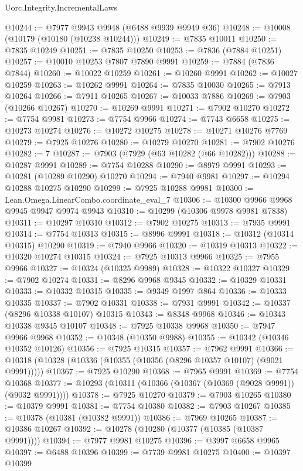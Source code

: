 \begin{lexlean}{Uorc.Integrity.IncrementalLaws}
\begin{coremodule}
@10244 := @7977 @9943 @9948 (@6488 @9939 @9949 @36)
@10248 := @10008 (@10179 (@10180 (@10238 @10244)))
@10249 := @7835 @10011
@10250 := @7835 @10249
@10251 := @7835 @10250
@10253 := @7836 (@7884 @10251)
@10257 := @10010 @10253 @7807 @7890 @9991
@10259 := @7884 (@7836 @7844)
@10260 := @10022 @10259
@10261 := @10260 @9991
@10262 := @10027 @10259
@10263 := @10262 @9991
@10264 := @7835 @10030
@10265 := @7913 @10264
@10266 := @7911 @10265
@10267 := @10033 @7886
@10269 := @7903 (@10266 @10267)
@10270 := @10269 @9991
@10271 := @7902 @10270
@10272 := @7754 @9981
@10273 := @7754 @9966
@10274 := @7743 @6658
@10275 := @10273 @10274
@10276 := @10272 @10275
@10278 := @10271 @10276 @7769
@10279 := @7925 @10276
@10280 := @10279 @10270
@10281 := @7902 @10276
@10282 := 7
@10287 := @7903 (@7929 (@63 @10282 (@66 @10282)))
@10288 := @10287 @9991
@10289 := @7754 @10288
@10290 := @8979 @9991
@10293 := @10281 (@10289 @10290) @10270
@10294 := @7940 @9981
@10297 := @10294 @10288 @10275 @10290
@10299 := @7925 @10288 @9981
@10300 := Lean.Omega.LinearCombo.coordinate_eval_7
@10306 := @10300 @9966 @9968 @9945 @9947 @9974 @9943
@10310 := @10299 (@10306 @9978 @9981 @7838)
@10311 := @10297 @10310
@10312 := @7902 @10275
@10313 := @7935 @9991
@10314 := @7754 @10313
@10315 := @8996 @9991
@10318 := @10312 (@10314 @10315) @10290
@10319 := @7940 @9966
@10320 := @10319 @10313
@10322 := @10320 @10274 @10315
@10324 := @7925 @10313 @9966
@10325 := @7955 @9966
@10327 := @10324 (@10325 @9989)
@10328 := @10322 @10327
@10329 := @7902 @10274
@10331 := @8296 @9968 @9345
@10332 := @10329 @10331
@10333 := @10332 @10315
@10335 := @9349 @1997 @864
@10336 := @10333 @10335
@10337 := @7902 @10331
@10338 := @7931 @9991
@10342 := @10337 (@8296 @10338 @10107) @10315
@10343 := @8348 @9968
@10346 := @10343 @10338 @9345 @10107
@10348 := @7925 @10338 @9968
@10350 := @7947 @9966 @9968
@10352 := @10348 (@10350 @9988)
@10355 := @10342 (@10346 @10352 @10126)
@10356 := @7925 @10315
@10357 := @7962 @9991
@10366 := @10318 (@10328 (@10336 (@10355 (@10356 (@8296 @10357 @10107) (@9021 @9991)))))
@10367 := @7925 @10290
@10368 := @7965 @9991
@10369 := @7754 @10368
@10377 := @10293 (@10311 (@10366 (@10367 (@10369 (@9028 @9991)) (@9032 @9991))))
@10378 := @7925 @10270
@10379 := @7903 @10265
@10380 := @10379 @9991
@10381 := @7754 @10380
@10382 := @7903 @10267
@10385 := @10378 (@10381 (@10382 @9991))
@10386 := @7969 @10265
@10387 := @10386 @10267
@10392 := @10278 (@10280 (@10377 (@10385 (@10387 @9991))))
@10394 := @7977 @9981 @10275
@10396 := @3997 @6658 @9965
@10397 := @6488 @10396
@10399 := @7739 @9981 @10275
@10400 := @10397 @10399

\end{coremodule}
\end{lexlean}
